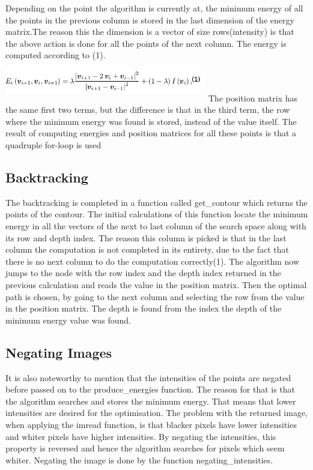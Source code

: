 \documentclass[12pt,a4paper,twocolumn]{article}
\begin{document}
Depending on the point the algorithm is currently at, the minimum energy of all the points in the previous column is stored in the last dimension of the energy matrix.The reason this the dimension is a vector of size rows(intensity) is that the above action is done for all the points of the next column. The energy is computed according to (1). 
\includegraphics[width=250pt,height=50pt,scale=1]{energy_eq.jpg}
The position matrix has the same first two terms, but the difference is that in the third term, the row where the minimum energy was found is stored, instead of the value itself. The result of computing energies and position matrices for all these points is that a quadruple for-loop is used
\subsection{Backtracking}
The backtracking is completed in a function called get\_contour which returns the points of the contour. The initial calculations of this function locate the minimum energy in all the vectors of the next to last column of the search space along with its row and depth index. The reason this column is picked is that in the last column the computation is not completed in its entirety, due to the fact that there is no next column to do the computation correctly(1). The algorithm now jumps to the node with the row index and the depth index returned in the previous calculation and reads the value in the position matrix. Then the optimal path is chosen, by going to the next column and selecting the row from the value in the position matrix. The depth is found from the index the depth of the minimum energy value was found.
\subsection{Negating Images}
It is also noteworthy to mention that the intensities of the points are negated before passed on to the produce\_energies function. The reason for that is that the algorithm searches and stores the minimum energy. That means that lower intensities are desired for the optimisation. The problem with the returned image, when applying the imread function, is that blacker pixels have lower intensities and whiter pixels have higher intensities. By negating the intensities, this property is reversed and hence the algorithm searches for pixels which seem whiter. Negating the image is done by the function negating\_intensities.
\end{document}
